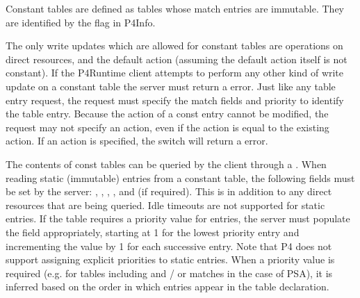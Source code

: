 \documentclass[11pt]{article}
\begin{document}
{%
\noindent{}Constant tables are defined as tables whose match entries are immutable. They
are identified by the  flag in P4Info.%

The only write updates which are allowed for constant tables are 
operations on direct resources, and the default action (assuming the default
action itself is not constant). If the P4Runtime client attempts to perform any
other kind of write update on a constant table the server must return a
 error. Just like any table entry  request, the
request must specify the match fields and priority to identify the table
entry. Because the action of a const entry cannot be modified, the request
may not specify an action, even if the action is equal to the existing action.
If an action is specified, the switch will return a  error.%

The contents of const tables can be queried by the client through a
. When reading static (immutable) entries from a constant table,
the following fields must be set by the server: , , ,
, and  (if required). This is in addition to any
direct resources that are being queried.  Idle timeouts are not supported for
static entries. If the table requires a priority value for entries, the server
must populate the  field appropriately, starting at 1 for the lowest
priority entry and incrementing the value by 1 for each successive entry. Note
that P4 does not support assigning explicit priorities to static
entries. When a priority value is required (e.g. for tables including 
and / or  matches in the case of PSA), it is inferred based on the
order in which entries appear in the table declaration.%

}
\end{document}
